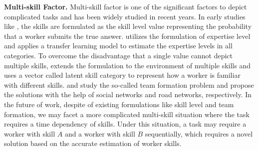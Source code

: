 \documentclass[11pt]{article}
\newcommand{\fakeparagraph}[1]{\vspace{1mm}\noindent\textbf{#1.}}
\begin{document}
\fakeparagraph{Multi-skill Factor}
Multi-skill factor is one of the significant factors to depict complicated tasks and has been widely studied in recent years.
In early studies like \cite{aaai12taskassignment,icml13adaptive}, the skills are formulated as the skill level value representing the probability that a worker submits the true answer.
\cite{kdd13transfer} utilizes the formulation of expertise level and applies a transfer learning model to estimate the expertise levels in all categories.
To overcome the disadvantage that a single value cannot depict multiple skills, \cite{edbt15crowdsel} extends the formulation to the environment of multiple skills and uses a vector called latent skill category to represent how a worker is familiar with different skills.
\cite{dse17topk} and \cite{aamas16truthful} study the so-called team formation problem and propose the solutions with the help of social networks and road networks, respectively.
In the future of work, despite of existing formulations like skill level and team formation, we may facet a more complicated multi-skill situation where the task requires a time dependency of skills.
Under this situation, a task may require a worker with skill $A$ and a worker with skill $B$ sequentially, which requires a novel solution based on the accurate estimation of worker skills.
\end{document}
